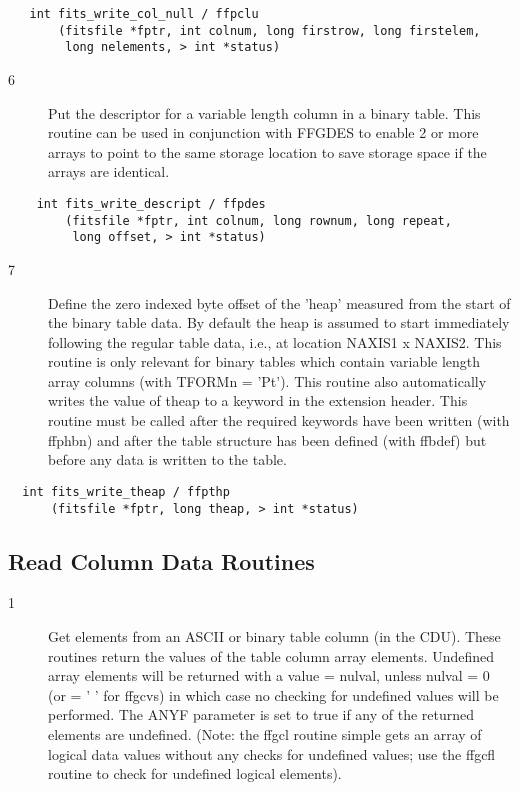 \begin{verbatim}
   int fits_write_col_null / ffpclu
       (fitsfile *fptr, int colnum, long firstrow, long firstelem,
        long nelements, > int *status)
\end{verbatim}

\begin{description}
\item[6 ] Put the descriptor for a variable length column in a binary table.
    This routine can be used in conjunction with FFGDES to enable
    2 or more arrays to point to the same storage location to save
   storage space if the arrays are identical.
\end{description}

\begin{verbatim}
    int fits_write_descript / ffpdes
        (fitsfile *fptr, int colnum, long rownum, long repeat,
         long offset, > int *status)
\end{verbatim}

\begin{description}
\item[7 ] Define the zero indexed byte offset of the 'heap' measured from
    the start of the binary table data.  By default the heap is assumed
    to start immediately following the regular table data, i.e., at
    location NAXIS1 x NAXIS2.  This routine is only relevant for
    binary tables which contain variable length array columns (with
    TFORMn = 'Pt').  This routine also automatically writes
    the value of theap to a keyword in the extension header.  This
    routine must be called after the required keywords have been
    written (with ffphbn) and after the table structure has been defined
   (with ffbdef) but before any data is written to the table.
\end{description}

\begin{verbatim}
  int fits_write_theap / ffpthp
      (fitsfile *fptr, long theap, > int *status)
\end{verbatim}

\subsection{ Read Column Data Routines \label{FFGCL}}


\begin{description}
\item[1 ] Get elements from an ASCII or binary table column (in the CDU).  These
    routines return the values of the table column array elements.  Undefined
    array elements will be returned with a value = nulval, unless nulval = 0
    (or = ' ' for ffgcvs) in which case no checking for undefined values will
    be performed. The ANYF parameter is set to true if any of the returned
    elements are undefined. (Note: the ffgcl routine simple gets an array
    of logical data values without any checks for undefined values;  use
   the ffgcfl routine to check for undefined logical elements).
\end{description}

